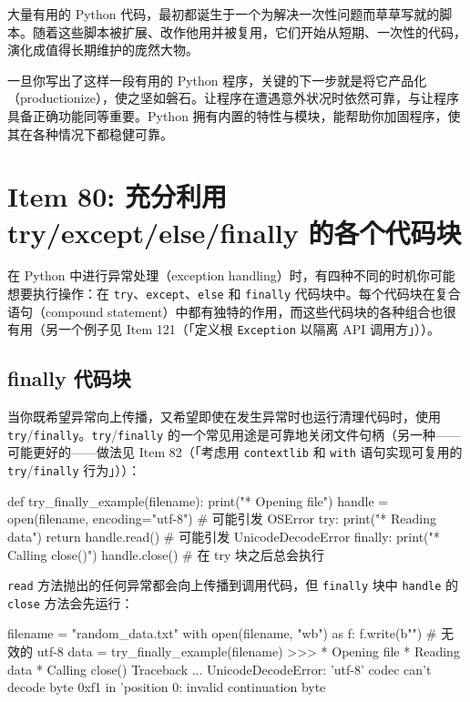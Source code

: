 大量有用的 Python 代码，最初都诞生于一个为解决一次性问题而草草写就的脚本。随着这些脚本被扩展、改作他用并被复用，它们开始从短期、一次性的代码，演化成值得长期维护的庞然大物。

一旦你写出了这样一段有用的 Python 程序，关键的下一步就是将它产品化（productionize），使之坚如磐石。让程序在遭遇意外状况时依然可靠，与让程序具备正确功能同等重要。Python 拥有内置的特性与模块，能帮助你加固程序，使其在各种情况下都稳健可靠。

\section{Item 80: 充分利用 try/except/else/finally 的各个代码块}

在 Python 中进行异常处理（exception handling）时，有四种不同的时机你可能想要执行操作：在 \texttt{try}、\texttt{except}、\texttt{else} 和 \texttt{finally} 代码块中。每个代码块在复合语句（compound statement）中都有独特的作用，而这些代码块的各种组合也很有用（另一个例子见 Item 121（「定义根 \texttt{Exception} 以隔离 API 调用方」））。

\subsection{finally 代码块}

当你既希望异常向上传播，又希望即使在发生异常时也运行清理代码时，使用 \texttt{try}/\texttt{finally}。\texttt{try}/\texttt{finally} 的一个常见用途是可靠地关闭文件句柄（另一种——可能更好的——做法见 Item 82（「考虑用 \texttt{contextlib} 和 \texttt{with} 语句实现可复用的 \texttt{try}/\texttt{finally} 行为」））：

\begin{codebox}[python]
def try_finally_example(filename):
    print("* Opening file")
    handle = open(filename, encoding="utf-8")  # 可能引发 OSError
    try:
        print("* Reading data")
        return handle.read()                   # 可能引发 UnicodeDecodeError
    finally:
        print("* Calling close()")
        handle.close()                         # 在 try 块之后总会执行
\end{codebox}

\texttt{read} 方法抛出的任何异常都会向上传播到调用代码，但 \texttt{finally} 块中 \texttt{handle} 的 \texttt{close} 方法会先运行：

\begin{codebox}[python]
filename = "random_data.txt"
with open(filename, "wb") as f:
    f.write(b"")  # 无效的 utf-8
data = try_finally_example(filename)
>>>
* Opening file
* Reading data
* Calling close()
Traceback ...
UnicodeDecodeError: 'utf-8' codec can't decode byte 0xf1 in
'position 0: invalid continuation byte
\end{codebox}


